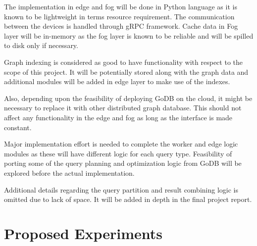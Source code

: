 \documentclass[conference]{IEEEtran}
\begin{document}
The implementation in edge and fog will be done in Python language as it is known to be lightweight in terms resource requirement. The communication between the devices is handled through gRPC framework. Cache data in Fog layer will be in-memory as the fog layer is known to be reliable and will be spilled to disk only if necessary.

Graph indexing is considered as good to have functionality with respect to the scope of this project. It will be potentially stored along with the graph data and additional modules will be added in edge layer to make use of the indexes.

Also, depending upon the feasibility of deploying GoDB on the cloud, it might be necessary to replace it with other distributed graph database. This should not affect any functionality in the edge and fog as long as the interface is made constant.

Major implementation effort is needed to complete the worker and edge logic modules as these will have different logic for each query type. Feasibility of porting some of the query planning and optimization logic from GoDB will be explored before the actual implementation.

Additional details regarding the query partition and result combining logic is omitted due to lack of space. It will be added in depth in the final project report.

\section{Proposed Experiments}






\end{document}

